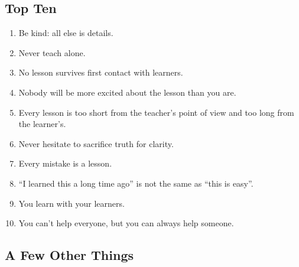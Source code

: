 
\subsection{Top Ten}\label{top-ten}

\begin{enumerate}
\def\labelenumi{\arabic{enumi}.}
\itemsep1pt\parskip0pt
\item
  Be kind: all else is details.
\item
  Never teach alone.
\item
  No lesson survives first contact with learners.
\item
  Nobody will be more excited about the lesson than you are.
\item
  Every lesson is too short from the teacher's point of view and too
  long from the learner's.
\item
  Never hesitate to sacrifice truth for clarity.
\item
  Every mistake is a lesson.
\item
  ``I learned this a long time ago'' is not the same as ``this is
  easy''.
\item
  You learn with your learners.
\item
  You can't help everyone, but you can always help someone.
\end{enumerate}

\subsection{A Few Other Things}\label{a-few-other-things}

